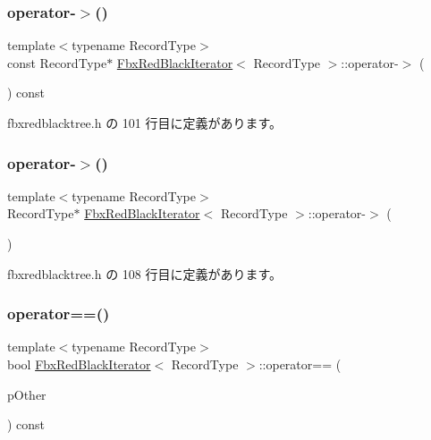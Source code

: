 \subsubsection{\texorpdfstring{operator-\/$>$()}{operator->()}\hspace{0.1cm}{\footnotesize\ttfamily [1/2]}}
{\footnotesize\ttfamily template$<$typename Record\+Type$>$ \\
const Record\+Type$\ast$ \hyperlink{class_fbx_red_black_iterator}{Fbx\+Red\+Black\+Iterator}$<$ Record\+Type $>$\+::operator-\/$>$ (\begin{DoxyParamCaption}{ }\end{DoxyParamCaption}) const\hspace{0.3cm}{\ttfamily [inline]}}



 fbxredblacktree.\+h の 101 行目に定義があります。

\mbox{\label{class_fbx_red_black_iterator_a562051f415cb531defaedac5831720c5}} 
\subsubsection{\texorpdfstring{operator-\/$>$()}{operator->()}\hspace{0.1cm}{\footnotesize\ttfamily [2/2]}}
{\footnotesize\ttfamily template$<$typename Record\+Type$>$ \\
Record\+Type$\ast$ \hyperlink{class_fbx_red_black_iterator}{Fbx\+Red\+Black\+Iterator}$<$ Record\+Type $>$\+::operator-\/$>$ (\begin{DoxyParamCaption}{ }\end{DoxyParamCaption})\hspace{0.3cm}{\ttfamily [inline]}}



 fbxredblacktree.\+h の 108 行目に定義があります。

\mbox{\label{class_fbx_red_black_iterator_a6535989054ef8b1f3c04d1993ee30c39}} 
\subsubsection{\texorpdfstring{operator==()}{operator==()}}
{\footnotesize\ttfamily template$<$typename Record\+Type$>$ \\
bool \hyperlink{class_fbx_red_black_iterator}{Fbx\+Red\+Black\+Iterator}$<$ Record\+Type $>$\+::operator== (\begin{DoxyParamCaption}\item[{const \hyperlink{class_fbx_red_black_iterator}{Fbx\+Red\+Black\+Iterator}$<$ Record\+Type $>$ \&}]{p\+Other }\end{DoxyParamCaption}) const\hspace{0.3cm}{\ttfamily [inline]}}



